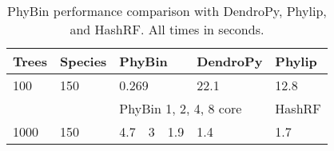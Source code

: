 
\begin{table}
\begin{tabular}{| l | l | l | l | l | l | l |}
\hline
Trees     & Species    & \multicolumn{3}{|l|}{PhyBin} & DendroPy & Phylip \\ \hline
100       & 150        & \multicolumn{3}{|l|}{0.269}  & 22.1     & 12.8   \\ \hline
          &            & \multicolumn{4}{|l|}{PhyBin 1, 2, 4, 8 core} & HashRF \\ \hline
1000      & 150        & 4.7      & 3     & 1.9     & 1.4      & 1.7      \\ \hline
\end{tabular}
\caption{PhyBin performance comparison with DendroPy, Phylip, and HashRF.  All
  times in seconds.}
\label{t:phybin-bench}
\end{table}










